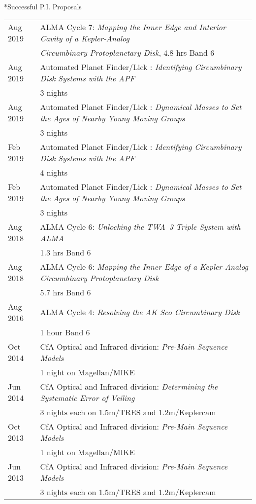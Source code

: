 \documentclass[10pt]{article}
\makeatletter
\renewcommand{\section}{\@startsection{section}{1}{0pt}{-\baselineskip}{0.5\baselineskip}{\scshape\color{myblue1}}}
\makeatother
\begin{document}
\section*{Successful P.I. Proposals}
\begin{tabular*}{\textwidth}{@{\hspace{10pt}}p{1.2in}l}
  Aug 2019 & ALMA Cycle 7: \emph{Mapping the Inner Edge and Interior Cavity of a Kepler-Analog}\\
  & \emph{Circumbinary Protoplanetary Disk}, 4.8 hrs Band 6\\
  Aug 2019 & Automated Planet Finder/Lick : \emph{Identifying Circumbinary Disk Systems with the APF} \\
  & 3 nights \\
  Aug 2019 & Automated Planet Finder/Lick : \emph{Dynamical Masses to Set the Ages of Nearby Young Moving Groups} \\
  & 3 nights \\
  Feb 2019 & Automated Planet Finder/Lick : \emph{Identifying Circumbinary Disk Systems with the APF} \\
  & 4 nights \\
  Feb 2019 & Automated Planet Finder/Lick : \emph{Dynamical Masses to Set the Ages of Nearby Young Moving Groups} \\
  & 3 nights \\
  Aug 2018 & ALMA Cycle 6: \emph{Unlocking the TWA~3 Triple System with ALMA}\\
  & 1.3 hrs Band 6\\
  Aug 2018 & ALMA Cycle 6: \emph{Mapping the Inner Edge of a Kepler-Analog Circumbinary Protoplanetary Disk}\\
  & 5.7 hrs Band 6\\
  Aug 2016 & ALMA Cycle 4: \emph{Resolving the AK Sco Circumbinary Disk}\\
  & 1 hour Band 6\\
  Oct 2014 & CfA Optical and Infrared division: \emph{Pre-Main Sequence Models}\\
  & 1 night on Magellan/MIKE\\
  Jun 2014 & CfA Optical and Infrared division: \emph{Determining the Systematic Error of Veiling}\\
  & 3 nights each on 1.5m/TRES and 1.2m/Keplercam\\
  Oct 2013 & CfA Optical and Infrared division: \emph{Pre-Main Sequence Models} \\
  & 1 night on Magellan/MIKE\\
  Jun 2013 & CfA Optical and Infrared division: \emph{Pre-Main Sequence Models}\\
  &  3 nights each on 1.5m/TRES and 1.2m/Keplercam\\
\end{tabular*}
\end{document}
